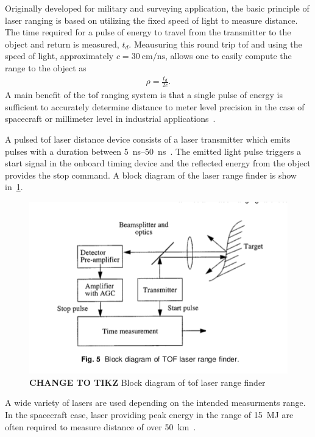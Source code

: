 Originally developed for military and surveying application, the basic principle of laser ranging is based on utilizing the fixed speed of light to measure distance.
The time required for a pulse of energy to travel from the transmitter to the object and return is measured, \( t_d \). 
Meausuring this round trip \gls{tof} and using the speed of light, approximately \( c = \SI{30}{\centi\meter\per\nano\second}\), allows one to easily compute the range to the object as
\begin{align}
    \rho = \frac{t_d}{2 c}. 
\end{align}
A main benefit of the \gls{tof} ranging system is that a single pulse of energy is sufficient to accurately determine distance to meter level precision in the case of spacecraft or millimeter level in industrial applications~\cite{zuber1997,cole1998,amann2001}.

A pulsed \gls{tof} laser distance device consists of a laser transmitter which emits pulses with a duration between \SIrange{5}{50}{\nano\second}~\cite{amann2001}.
The emitted light pulse triggers a start signal in the onboard timing device and the reflected energy from the object provides the stop command.
A block diagram of the laser range finder is show in~\cref{fig:lidar_block_diagram}.
\begin{figure}[htbp]
    \centering
    \includegraphics[width=\textwidth]{figures/raycasting/block_diagram.png}
    \caption{\textbf{CHANGE TO TIKZ} Block diagram of \gls{tof} laser range finder\label{fig:lidar_block_diagram}}
\end{figure}
A wide variety of lasers are used depending on the intended measurments range.
In the spacecraft case, laser providing peak energy in the range of \SI{15}{\mega\joule} are often required to measure distance of over \SI{50}{\kilo\meter}~\cite{berry2013}.

